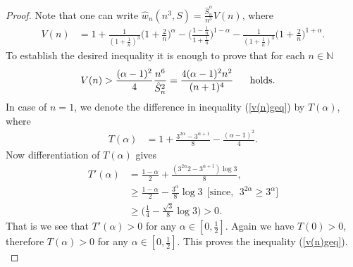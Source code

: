 \documentclass[12pt]{amsart}
\theoremstyle{definition}
\theoremstyle{plain}
\theoremstyle{definition}
\numberwithin{equation}{section}
\begin{document}
\begin{proof}
Note that one can write $\hat{w}_{n}(n^3, S)=\frac{\hat{S}_{n}^{\alpha}}{n^3}V(n)$, where
\begin{align*}
V(n)&=1+\frac{1}{(1+\frac{1}{n})^{3}}\Big(1+\frac{2}{n}\Big)^{\alpha}-\Big(\frac{1-\frac{1}{n}}{1+\frac{1}{n}}\Big)^{1-\alpha}-
\frac{1}{(1+\frac{1}{n})^{3}}\Big(1+\frac{2}{n}\Big)^{1+\alpha}.
\end{align*}To establish the desired inequality it is enough to prove that for each $n\in\mathbb{N}$
\begin{align}{\label{v(n)geq}}
&V(n)>\frac{(\alpha-1)^{2}}{4}\frac{n^{6}}{\hat{S}_{n}^{2}}=\frac{4(\alpha-1)^{2}n^{2}}{(n+1)^{4}}~~~~~\mbox{holds}.
\end{align}
In case of $n=1$, we denote the difference in inequality (\ref{v(n)geq}) by $T(\alpha)$, where
\begin{align}
T(\alpha)&=1+\frac{3^{2\alpha}-3^{\alpha+1}}{8}-\frac{(\alpha-1)^{2}}{4}.
\end{align}
Now differentiation of $T(\alpha)$ gives
\begin{align*}
T'(\alpha)&=\frac{1-\alpha}{2}+\frac{(3^{2\alpha}2-3^{\alpha+1})\log3}{8},\\
&\geq\frac{1-\alpha}{2}-\frac{3^{\alpha}}{8}\log3~~\Big[\mbox{since},~~3^{2\alpha}\geq3^{\alpha}\Big]\\
&\geq\Big(\frac{1}{4}-\frac{\sqrt3}{8}\log3\Big)>0.
\end{align*}
 That is we see  that $T'(\alpha)>0$ for any $\alpha\in[0, \frac{1}{2}]$. Again we have $T(0)>0$, therefore $T(\alpha)>0$ for any $\alpha\in[0,\frac{1}{2}]$. This proves the inequality (\ref{v(n)geq}).\\

\end{proof}
\end{document}

